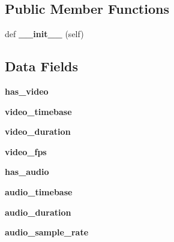 \subsection*{Public Member Functions}
\begin{DoxyCompactItemize}
\item 
\mbox{\label{classtorchvision_1_1io_1_1__video__opt_1_1VideoMetaData_a69d873d1c4fc6d12d06b1a2dcbb8ff67}} 
def {\bfseries \+\_\+\+\_\+init\+\_\+\+\_\+} (self)
\end{DoxyCompactItemize}
\subsection*{Data Fields}
\begin{DoxyCompactItemize}
\item 
\mbox{\label{classtorchvision_1_1io_1_1__video__opt_1_1VideoMetaData_ac341b6a8db123f6dec6ba1bc5fa6f517}} 
{\bfseries has\+\_\+video}
\item 
\mbox{\label{classtorchvision_1_1io_1_1__video__opt_1_1VideoMetaData_a2c5c49693cc99af47be550ac7d50efab}} 
{\bfseries video\+\_\+timebase}
\item 
\mbox{\label{classtorchvision_1_1io_1_1__video__opt_1_1VideoMetaData_aaf6411b747b8530e1fb635bc0ad3d200}} 
{\bfseries video\+\_\+duration}
\item 
\mbox{\label{classtorchvision_1_1io_1_1__video__opt_1_1VideoMetaData_a0c4b8c3a68646c596e53eb1f6fea55ed}} 
{\bfseries video\+\_\+fps}
\item 
\mbox{\label{classtorchvision_1_1io_1_1__video__opt_1_1VideoMetaData_afb81e73b463957ed289f1c896761fc09}} 
{\bfseries has\+\_\+audio}
\item 
\mbox{\label{classtorchvision_1_1io_1_1__video__opt_1_1VideoMetaData_a33b7f24443e2bf8c602a97ac55290814}} 
{\bfseries audio\+\_\+timebase}
\item 
\mbox{\label{classtorchvision_1_1io_1_1__video__opt_1_1VideoMetaData_ad8a1157908aef81aff06525943c8a29a}} 
{\bfseries audio\+\_\+duration}
\item 
\mbox{\label{classtorchvision_1_1io_1_1__video__opt_1_1VideoMetaData_a0195438c36e102536226fe36a9b0a10f}} 
{\bfseries audio\+\_\+sample\+\_\+rate}
\end{DoxyCompactItemize}


